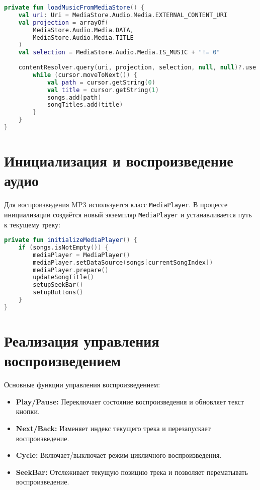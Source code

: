 \begin{lstlisting}[language=Kotlin, caption={Загрузка музыки из MediaStore}]
private fun loadMusicFromMediaStore() {
    val uri: Uri = MediaStore.Audio.Media.EXTERNAL_CONTENT_URI
    val projection = arrayOf(
        MediaStore.Audio.Media.DATA,
        MediaStore.Audio.Media.TITLE
    )
    val selection = MediaStore.Audio.Media.IS_MUSIC + "!= 0"
    
    contentResolver.query(uri, projection, selection, null, null)?.use { cursor ->
        while (cursor.moveToNext()) {
            val path = cursor.getString(0)
            val title = cursor.getString(1)
            songs.add(path)
            songTitles.add(title)
        }
    }
}
\end{lstlisting}

\section{Инициализация и воспроизведение аудио}

Для воспроизведения MP3 используется класс \texttt{MediaPlayer}. В процессе инициализации создаётся новый экземпляр \texttt{MediaPlayer} и устанавливается путь к текущему треку:

\begin{lstlisting}[language=Kotlin, caption={Инициализация MediaPlayer}]
private fun initializeMediaPlayer() {
    if (songs.isNotEmpty()) {
        mediaPlayer = MediaPlayer()
        mediaPlayer.setDataSource(songs[currentSongIndex])
        mediaPlayer.prepare()
        updateSongTitle()
        setupSeekBar()
        setupButtons()
    }
}
\end{lstlisting}

\section{Реализация управления воспроизведением}

Основные функции управления воспроизведением:

\begin{itemize}
\item \textbf{Play/Pause:} Переключает состояние воспроизведения и обновляет текст кнопки.
\item \textbf{Next/Back:} Изменяет индекс текущего трека и перезапускает воспроизведение.
\item \textbf{Cycle:} Включает/выключает режим цикличного воспроизведения.
\item \textbf{SeekBar:} Отслеживает текущую позицию трека и позволяет перематывать воспроизведение.
\end{itemize}


